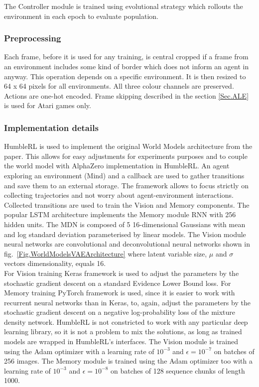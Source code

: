 The Controller module is trained using evolutional strategy which rollouts the environment in each epoch to evaluate population.

\subsubsection{Preprocessing}

Each frame, before it is used for any training, is central cropped if a frame from an environment includes some kind of border which does not inform an agent in anyway. This operation depends on a specific environment. It is then resized to 64 x 64 pixels for all environments. All three colour channels are preserved. Actions are one-hot encoded. Frame skipping described in the section \ref{Sec.ALE} is used for Atari games only.

\subsubsection{Implementation details}

HumbleRL is used to implement the original World Models architecture from the paper. This allows for easy adjustments for experiments purposes and to couple the world model with AlphaZero implementation in HumbleRL. An agent exploring an environment (Mind) and a callback are used to gather transitions and save them to an external storage. The framework allows to focus strictly on collecting trajectories and not worry about agent-environment interactions. \\
Collected transitions are used to train the Vision and Memory components. The popular LSTM architecture \cite{Algo.LSTM} implements the Memory module RNN with 256 hidden units. The MDN is composed of 5 16-dimensional Gaussians with mean and log standard deviation parameterised by linear models. The Vision module neural networks are convolutional and deconvolutional neural networks shown in fig.~\ref{Fig.WorldModelsVAEArchitecture} where latent variable size, $\mu$ and $\sigma$ vectors dimensionality, equals 16. \\
For Vision training Keras \cite{Code.Keras} framework is used to adjust the parameters by the stochastic gradient descent on a standard Evidence Lower Bound loss. For Memory training PyTorch \cite{Code.PyTorch} framework is used, since it is easier to work with recurrent neural networks than in Keras, to, again, adjust the parameters by the stochastic gradient descent on a negative log-probability loss of the mixture density network. HumbleRL is not constricted to work with any particular deep learning library, so it is not a problem to mix the solutions, as long as trained models are wrapped in HumbleRL's interfaces.
The Vision module is trained using the Adam optimizer \cite{Algo.Adam} with a learning rate of $10^{-3}$ and $\epsilon = 10^{−7}$ on batches of 256 images. The Memory module is trained using the Adam optimizer \cite{Algo.Adam} too with a learning rate of $10^{-3}$ and $\epsilon = 10^{−8}$ on batches of 128 sequence chunks of length 1000.

